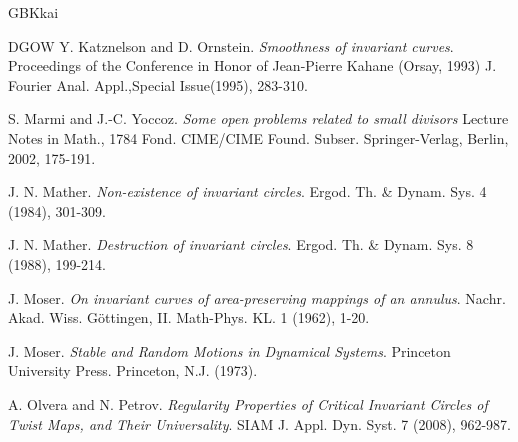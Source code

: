 \documentclass{amsart}
\theoremstyle{definition}
\begin{document}
\begin{CJK*}{GBK}{kai}
\begin{thebibliography}{DGOW}
			Y. Katznelson and D. Ornstein. {\it
				Smoothness of invariant curves}.
			Proceedings of the Conference in Honor of Jean-Pierre Kahane (Orsay, 1993)
			J. Fourier Anal. Appl.,Special Issue(1995), 283-310.
			
			
			
			
			
			 S. Marmi and J.-C. Yoccoz. {\it Some open problems related to small divisors}
			Lecture Notes in Math., 1784
			Fond. CIME/CIME Found. Subser.
			Springer-Verlag, Berlin, 2002, 175-191.
			
			 J. N. Mather. {\it Non-existence of invariant circles}. Ergod.
			Th. \& Dynam. Sys. {4} (1984), 301-309.
			
			
			
			 J. N. Mather. {\it Destruction of invariant circles}. Ergod.
			Th. \& Dynam. Sys. {8} (1988), 199-214.
			
			
			
			
			 J. Moser. {\it On invariant curves of area-preserving mappings of an annulus}. Nachr. Akad. Wiss. G\"{o}ttingen,
			II. Math-Phys. KL. {1} (1962), 1-20.
			
			  J. Moser. {\it Stable and Random Motions in Dynamical Systems}. Princeton University
			Press. Princeton, N.J. (1973).
			
			
			
			 A. Olvera and N. Petrov. {\it Regularity Properties of Critical Invariant Circles
				of Twist Maps, and Their Universality}. SIAM J. Appl. Dyn. Syst.   7 (2008), 962-987.
			
			
			
			
			

\end{thebibliography}
\end{CJK*}
\end{document}
